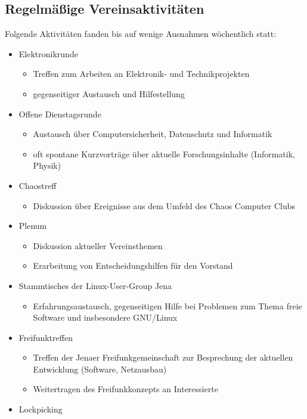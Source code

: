 \documentclass[10pt, a4paper]{scrartcl}
\begin{document}
\subsection*{Regelmäßige Vereinsaktivitäten}
Folgende Aktivitäten fanden bis auf wenige Ausnahmen wöchentlich statt:
\begin{itemize}
	\item Elektronikrunde
		\begin{itemize}
		    \item Treffen zum Arbeiten an Elektronik- und Technikprojekten
		    \item gegenseitiger Austausch und Hilfestellung
		\end{itemize}
	\item Offene Dienstagsrunde
		\begin{itemize}
			\item Austausch über Computersicherheit, Datenschutz und Informatik
			\item oft spontane Kurzvorträge über aktuelle Forschungsinhalte (Informatik, Physik)
		\end{itemize}
	\item Chaostreff
		\begin{itemize}
			\item Diskussion über Ereignisse aus dem Umfeld des Chaos Computer Clubs
		\end{itemize}
	\item Plenum
		\begin{itemize}
			\item Diskussion aktueller Vereinsthemen
			\item Erarbeitung von Entscheidungshilfen für den Vorstand
		\end{itemize}
	\item Stammtisches der Linux-User-Group Jena
		\begin{itemize}
			\item Erfahrungsaustausch, gegenseitigen Hilfe bei Problemen zum Thema freie Software und insbesondere GNU/Linux
		\end{itemize}
	\item Freifunktreffen
		\begin{itemize}
		    \item Treffen der Jenaer Freifunkgemeinschaft zur Besprechung der aktuellen Entwicklung (Software, Netzausbau)
		    \item Weitertragen des Freifunkkonzepts an Interessierte
		\end{itemize}
	\item Lockpicking

\end{itemize}
\end{document}
